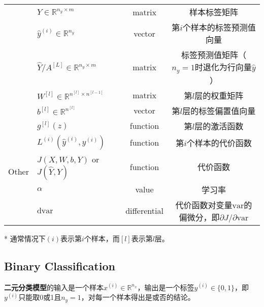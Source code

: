 \begin{table}[ht]
\begin{threeparttable}
\begin{tabular}{clcc}
									& $Y \in {\mathbb{R}^{n_y \times m}}$                   & matrix               & 样本标签矩阵                                                           \\									
									& $\hat{y}^{(i)} \in \mathbb{R}^{n_y}$                  & vector               & 第$i$个样本的标签预测值向量                                                \\
									& $\hat{Y} / A^{[L]} \in {\mathbb{R}^{n_y \times m}}$   & matrix               & 标签预测值矩阵（$n_y=1$时退化为行向量$\hat{y}$）   						\\
									& $W^{[l]} \in \mathbb{R}^{n^{[l]} \times n^{[l-1]}}$   & matrix               & 第$l$层的权重矩阵                                                               \\
									& $b^{[l]} \in \mathbb{R}^{n^{[l]}}$                    & vector               & 第$l$层的标签偏置值向量                                                        \\\hline
		\multirow{5}{*}{Other}      & $g^{[l]}(z)$                                          & function             & 第$l$层的激活函数                                                         \\
									& $L^{(i)}(\hat{y}^{(i)}, y^{(i)})$                     & function             & 第$i$个样本的代价函数                                                         \\
									& $J(X,W,b,Y)$ or $J(\hat{Y},Y)$                        & function             & 代价函数                                                                        \\
									& $\alpha$								                & value                & 学习率                                                                        \\
									& $\mathrm{d}\mathrm{var}$                              & differential         & 代价函数对变量$\mathrm{var}$的偏微分，即${\partial J}/{\partial \mathrm{var}}$ \\ \hline
	\end{tabular}
	\label{tab:notations} %
	\begin{tablenotes}
		\item[*] 通常情况下$(i)$表示第$i$个样本，而$[l]$表示第$l$层。
	\end{tablenotes}
	\end{threeparttable}
\end{table}

\subsection{Binary Classification}
\textbf{二元分类模型}的输入是一个样本$x^{(i)} \in \mathbb{R}^{n_x}$，输出是一个标签$y^{(i)} \in \{0, 1\}$，即$y^{(i)}$只能取0或1且$n_y=1$，对每一个样本得出是或否的结论。

